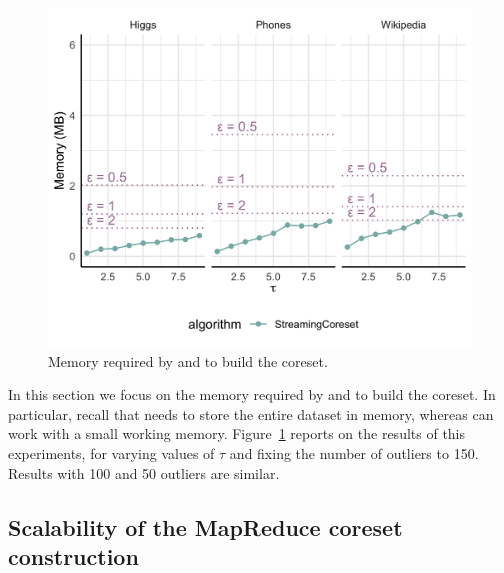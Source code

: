 \begin{figure}
    \includegraphics[width=\columnwidth]{memory-50}
    \caption{\label{fig:memory}Memory required by \stream and \seq to build the coreset.}
\end{figure}

In this section we focus on the memory required by \seq and \stream to build the
coreset.
In particular, recall that \seq needs to store the entire dataset in memory, whereas \stream 
can work with a small working memory.
Figure~\ref{fig:memory} reports on the results of this experiments, for varying values of $\tau$
and fixing the number of outliers to 150.
Results with 100 and 50 outliers are similar.


\subsection{Scalability of the MapReduce coreset construction}
\label{sec:exp:mapreduce}


